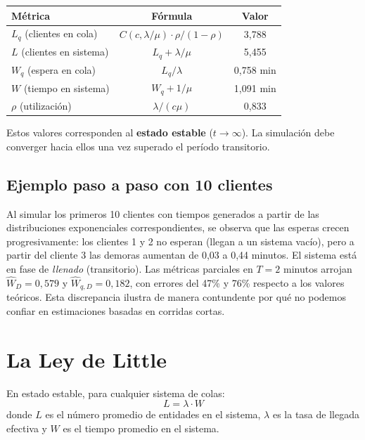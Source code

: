 \documentclass[11pt, letterpaper]{article}
\begin{document}
\begin{center}
\renewcommand{\arraystretch}{1.4}
\small
\begin{tabular}{@{}lcc@{}}
\toprule
\textbf{Métrica} & \textbf{Fórmula} & \textbf{Valor} \\
\midrule
$L_q$ (clientes en cola) & $C(c,\lambda/\mu)\cdot\rho/(1-\rho)$ & 3{,}788 \\
$L$ (clientes en sistema) & $L_q + \lambda/\mu$ & 5{,}455 \\
$W_q$ (espera en cola) & $L_q/\lambda$ & 0{,}758 min \\
$W$ (tiempo en sistema) & $W_q + 1/\mu$ & 1{,}091 min \\
$\rho$ (utilización) & $\lambda/(c\mu)$ & 0{,}833 \\
\bottomrule
\end{tabular}
\end{center}

Estos valores corresponden al \textbf{estado estable} ($t \to \infty$). La simulación debe converger hacia ellos una vez superado el período transitorio.

\subsection{Ejemplo paso a paso con 10 clientes}

Al simular los primeros 10 clientes con tiempos generados a partir de las distribuciones exponenciales correspondientes, se observa que las esperas crecen progresivamente: los clientes 1 y 2 no esperan (llegan a un sistema vacío), pero a partir del cliente 3 las demoras aumentan de 0{,}03 a 0{,}44 minutos. El sistema está en fase de \emph{llenado} (transitorio). Las métricas parciales en $T = 2$ minutos arrojan $\hat{W}_D = 0{,}579$ y $\hat{W}_{q,D} = 0{,}182$, con errores del 47\% y 76\% respecto a los valores teóricos. Esta discrepancia ilustra de manera contundente por qué no podemos confiar en estimaciones basadas en corridas cortas.


\section{La Ley de Little}

\begin{teorema}
En estado estable, para cualquier sistema de colas:
\[
\boxed{L = \lambda \cdot W}
\]
donde $L$ es el número promedio de entidades en el sistema, $\lambda$ es la tasa de llegada efectiva y $W$ es el tiempo promedio en el sistema.
\end{teorema}
\end{document}
